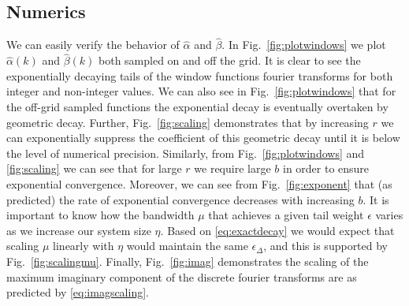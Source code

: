 \documentclass[aps,floatfix,10pt,amssymb,amsfont,amsmath,superscriptaddress,float,nofootinbib,longbibliography,nobalancelastpage,twocolumn]{revtex4-2}
\begin{document}
\subsection{Numerics}
We can easily verify the behavior of $\hat \alpha$ and $\hat \beta$. In Fig.~\ref{fig:plotwindows} we plot $\hat \alpha(k)$ and $\hat \beta(k)$ both sampled on and off the grid. It is clear to see the exponentially decaying tails of the window functions fourier transforms for both integer and non-integer values. We can also see in Fig.~\ref{fig:plotwindows} that for the off-grid sampled functions the exponential decay is eventually overtaken by geometric decay. Further, Fig.~\ref{fig:scaling} demonstrates that by increasing $r$ we can exponentially suppress the coefficient of this geometric decay until it is below the level of numerical precision. Similarly, from Fig.~\ref{fig:plotwindows} and \ref{fig:scaling} we can see that for large $r$ we require large $b$ in order to ensure exponential convergence. Moreover, we can see from Fig.~\ref{fig:exponent} that (as predicted) the rate of exponential convergence decreases with increasing $b$. It is important to know how the bandwidth $\mu$ that achieves a given tail weight $\epsilon$ varies as we increase our system size $\eta$. Based on \eqref{eq:exactdecay} we would expect that scaling $\mu$ linearly with $\eta$ would maintain the same $\epsilon_{\Delta}$, and this is supported by Fig.~\ref{fig:scalingmu}. Finally, Fig.~\ref{fig:imag} demonstrates the scaling of the maximum imaginary component of the discrete fourier transforms are as predicted by \eqref{eq:imagscaling}.
\end{document}

